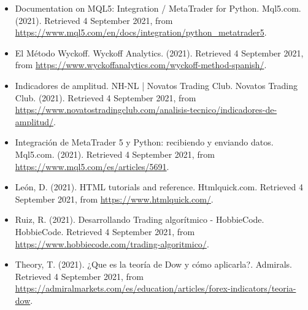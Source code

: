 \begin{itemize}
\item Documentation on MQL5: Integration / MetaTrader for Python. Mql5.com. (2021). Retrieved 4 September 2021, from \\
\href{https://www.mql5.com/en/docs/integration/python\_metatrader5}{https://www.mql5.com/en/docs/integration/python\_metatrader5}.\newline

\item El Método Wyckoff. Wyckoff Analytics. (2021). Retrieved 4 September 2021, from \href{https://www.wyckoffanalytics.com/wyckoff-method-spanish/}{https://www.wyckoffanalytics.com/wyckoff-method-spanish/}.\newline

\item Indicadores de amplitud. NH-NL | Novatos Trading Club. Novatos Trading Club. (2021). Retrieved 4 September 2021, from \\
\href{https://www.novatostradingclub.com/analisis-tecnico/indicadores-de-amplitud/}{https://www.novatostradingclub.com/analisis-tecnico/indicadores-de-amplitud/}.\newline

\item Integración de MetaTrader 5 y Python: recibiendo y enviando datos. Mql5.com. (2021). Retrieved 4 September 2021, from \\
\href{https://www.mql5.com/es/articles/5691}{https://www.mql5.com/es/articles/5691}.\newline

\item León, D. (2021). HTML tutorials and reference. Htmlquick.com. Retrieved 4 September 2021, from \href{https://www.htmlquick.com/}{https://www.htmlquick.com/}.\newline

\item Ruiz, R. (2021). Desarrollando Trading algorítmico - HobbieCode. HobbieCode. Retrieved 4 September 2021, from \\
\href{https://www.hobbiecode.com/trading-algoritmico/}{https://www.hobbiecode.com/trading-algoritmico/}.\newline

\item Theory, T. (2021). ¿Que es la teoría de Dow y cómo aplicarla?. Admirals. Retrieved 4 September 2021, from \\
\href{https://admiralmarkets.com/es/education/articles/forex-indicators/teoria-dow}{https://admiralmarkets.com/es/education/articles/forex-indicators/teoria-dow}.\newline


\end{itemize}
